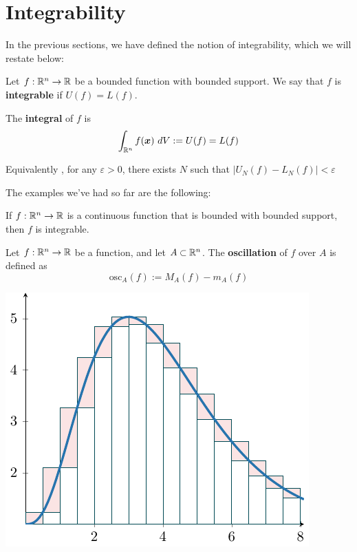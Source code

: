 \section{Integrability}\label{sec:integrability}

In the previous sections, we have defined the notion of integrability, which we will restate below:

\begin{definition}
    Let $f: \mathbb{R}^n \to \mathbb{R}$ be a bounded function with bounded support.
    We say that $f$ is \textbf{integrable} if $U(f) = L(f)$.
    
    The \textbf{integral} of $f$ is $$\int_{\mathbb{R}^n} f(\bm{x}) \ dV := U(f) = L(f)$$

    Equivalently , for any $\varepsilon > 0$,
    there exists $N$ such that $|U_N(f) - L_N(f)| < \varepsilon$
    \end{definition}

The examples we've had so far are the following:
        
    \begin{theorem}
     If $f : \mathbb{R}^n \to \mathbb{R}$ is a continuous function that is bounded with bounded support, then $f$ is integrable.   
    \end{theorem}


    \begin{definition}
    Let $f: \mathbb{R}^n \to \mathbb{R}$ be a function, and let $A \subset \mathbb{R}^n$.  The \textbf{oscillation} of $f$ over $A$ is defined as $$\text{osc}_A(f) := M_A(f) - m_A(f)$$
    \end{definition}

    \begin{center}
        \includegraphics{chapters/4-IntegrationRn/figures/figures-integraloscillation.pdf}
    \end{center}
    
